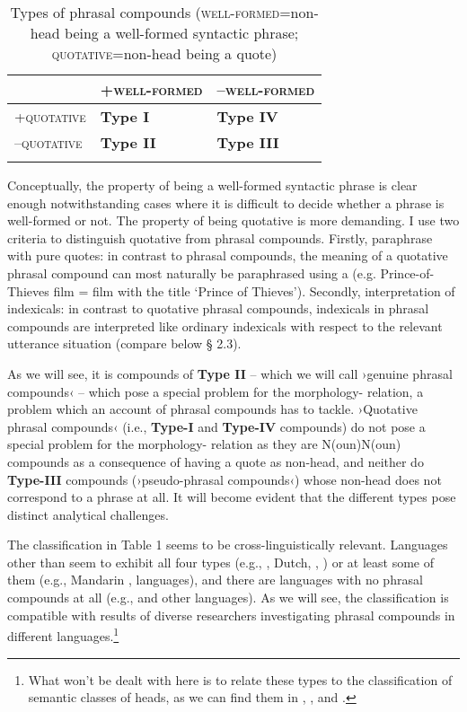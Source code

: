 \documentclass[output=paper]{LSP/langsci}
\begin{document}
\begin{table}
\begin{tabular}{lll}
\lsptoprule
 & +\textsc{well-formed} & –\textsc{well-formed}\\
\midrule
+\textsc{quotative} &  \bfseries Type I & \bfseries Type IV\\
\midrule
\scshape –quotative &
  \bfseries Type II &
 \bfseries Type III\\
\lspbottomrule
\end{tabular}
\caption{Types of phrasal compounds (\textsc{well-formed}=non-head being a well-formed syntactic phrase; \textsc{quotative}=non-head being a quote)}
\end{table}

Conceptually, the property of being a well-formed syntactic phrase is clear enough notwithstanding cases where it is difficult to decide whether a phrase is well-formed or not. The property of being quotative is more demanding. I use two criteria to distinguish quotative from  phrasal compounds. Firstly, paraphrase with pure quotes: in contrast to  phrasal compounds, the meaning of a quotative phrasal compound can most naturally be paraphrased using a  (e.g. Prince-of-Thieves film = film with the title `Prince of Thieves'). Secondly, interpretation of indexicals: in contrast to quotative phrasal compounds, indexicals in  phrasal compounds are interpreted like ordinary indexicals with respect to the relevant utterance situation (compare below § 2.3).

As we will see, it is compounds of \textbf{Type II} – which we will call ›genuine phrasal compounds‹ – which pose a special problem for the morphology- relation, a problem which an account of phrasal compounds has to tackle. ›Quotative phrasal compounds‹ (i.e., \textbf{Type-I} and \textbf{Type-IV} compounds) do not pose a special problem for the morphology- relation as they are N(oun)N(oun) compounds as a consequence of having a quote as non-head, and neither do \textbf{Type-III} compounds (›pseudo-phrasal compounds‹) whose non-head does not correspond to a phrase at all. It will become evident that the different types pose distinct analytical challenges.

The classification in Table 1 seems to be cross-linguistically relevant. Languages other than  seem to exhibit all four types (e.g., , Dutch, , ) or at least some of them (e.g., Mandarin ,  languages), and there are languages with no phrasal compounds at all (e.g.,  and other  languages). As we will see, the classification is compatible with results of diverse researchers investigating phrasal compounds in different languages.\footnote{What won't be dealt with here is to relate these types to the classification of semantic classes of heads, as we can find them in \citet [§6.1.1] {Meibauer2003}, \citet [§2.2] {TK15}, \citet [§2.3] {Goksel2015} and \citet [Kap. III.2.3] {Hein2015}.}
\end{document}
